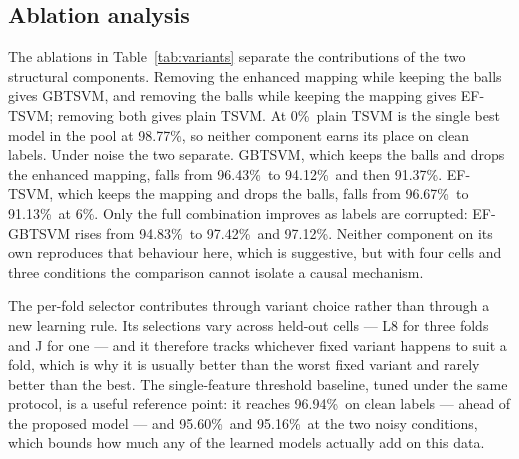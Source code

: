 \documentclass[final,5p,times,twocolumn]{elsarticle}
\newcommand{\nz}{\%}
\begin{document}
\subsection{Ablation analysis}\label{sec:ablation}
The ablations in Table~\ref{tab:variants} separate the contributions of the two structural components. Removing the enhanced mapping while keeping the balls gives GBTSVM, and removing the balls while keeping the mapping gives EF-TSVM; removing both gives plain TSVM. At 0\nz\ plain TSVM is the single best model in the pool at 98.77\nz, so neither component earns its place on clean labels. Under noise the two separate. GBTSVM, which keeps the balls and drops the enhanced mapping, falls from 96.43\nz\ to 94.12\nz\ and then 91.37\nz. EF-TSVM, which keeps the mapping and drops the balls, falls from 96.67\nz\ to 91.13\nz\ at 6\nz. Only the full combination improves as labels are corrupted: EF-GBTSVM rises from 94.83\nz\ to 97.42\nz\ and 97.12\nz. Neither component on its own reproduces that behaviour here, which is suggestive, but with four cells and three conditions the comparison cannot isolate a causal mechanism.

The per-fold selector contributes through variant choice rather than through a new learning rule. Its selections vary across held-out cells --- L8 for three folds and J for one --- and it therefore tracks whichever fixed variant happens to suit a fold, which is why it is usually better than the worst fixed variant and rarely better than the best. The single-feature threshold baseline, tuned under the same protocol, is a useful reference point: it reaches 96.94\nz\ on clean labels --- ahead of the proposed model --- and 95.60\nz\ and 95.16\nz\ at the two noisy conditions, which bounds how much any of the learned models actually add on this data.
\end{document}
